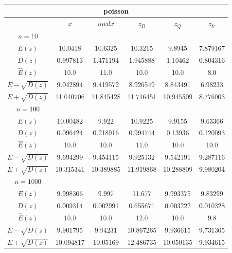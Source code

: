 \begin{tabular}{|c | c | c | c | c | c|} 
 \hline \multicolumn{6}{|c|}{poisson} \\ 
 \hline & $\bar{x}$ & $medx$ & $z_R$ & $z_Q$ & $z_{tr}$ 
 \\ \hline $n=10$ & & & & & \\ 
 \hline $E(z)$ 
 &10.0418 &10.6325 &10.3215 &9.8945 &7.879167 \\ 
 \hline $D(z)$ 
 &0.997813 &1.471194 &1.945888 &1.10462 &0.804316 \\ 
\hline $\hat{E}(z)$ 
&10.0&11.0&10.0&10.0&8.0 \\ 
\hline $E-\sqrt{D(z)}$ 
&9.042894&9.419572&8.926549&8.843491&6.98233 \\ 
\hline $E+\sqrt{D(z)}$ 
&11.040706&11.845428&11.716451&10.945509&8.776003 \\ \hline $n=100$ & & & & & \\ 
 \hline $E(z)$ 
 &10.00482 &9.922 &10.9225 &9.9155 &9.63366 \\ 
 \hline $D(z)$ 
 &0.096424 &0.218916 &0.994744 &0.13936 &0.120093 \\ 
\hline $\hat{E}(z)$ 
&10.0&10.0&11.0&10.0&10.0 \\ 
\hline $E-\sqrt{D(z)}$ 
&9.694299&9.454115&9.925132&9.542191&9.287116 \\ 
\hline $E+\sqrt{D(z)}$ 
&10.315341&10.389885&11.919868&10.288809&9.980204 \\ \hline $n=1000$ & & & & & \\ 
 \hline $E(z)$ 
 &9.998306 &9.997 &11.677 &9.993375 &9.83299 \\ 
 \hline $D(z)$ 
 &0.009314 &0.002991 &0.655671 &0.003222 &0.010328 \\ 
\hline $\hat{E}(z)$ 
&10.0&10.0&12.0&10.0&9.8 \\ 
\hline $E-\sqrt{D(z)}$ 
&9.901795&9.94231&10.867265&9.936615&9.731365 \\ 
\hline $E+\sqrt{D(z)}$ 
&10.094817&10.05169&12.486735&10.050135&9.934615 \\ \hline 
 \end{tabular}